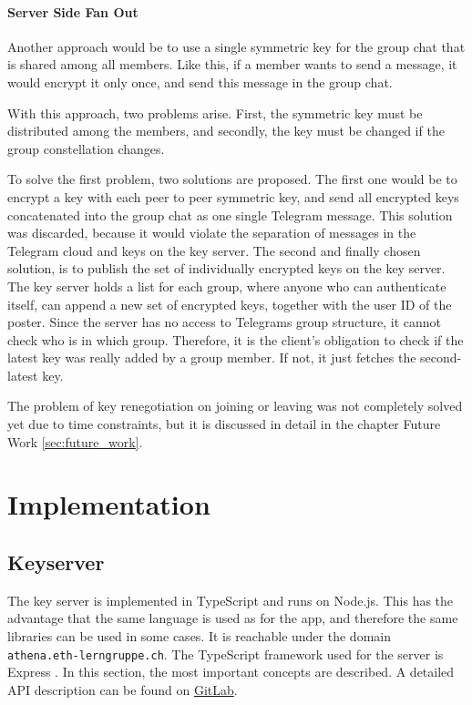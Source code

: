 \documentclass[a4paper, oneside]{discothesis}
\begin{document}
\subsubsection{Server Side Fan Out}

Another approach would be to use a single symmetric key for the group chat that is shared among all members. Like this, if a member wants to send a message, it would encrypt it only once, and send this message in the group chat.

With this approach, two problems arise. First, the symmetric key must be distributed among the members, and secondly, the key must be changed if the group constellation changes.

To solve the first problem, two solutions are proposed. The first one would be to encrypt a key with each peer to peer symmetric key, and send all encrypted keys concatenated into the group chat as one single Telegram message. This solution was discarded, because it would violate the separation of messages in the Telegram cloud and keys on the key server. The second and finally chosen solution, is to publish the set of individually encrypted keys on the key server. The key server holds a list for each group, where anyone who can authenticate itself, can append a new set of encrypted keys, together with the user ID of the poster. Since the server has no access to Telegrams group structure, it cannot check who is in which group. Therefore, it is the client's obligation to check if the latest key was really added by a group member. If not, it just fetches the second-latest key.

The problem of key renegotiation on joining or leaving was not completely solved yet due to time constraints, but it is discussed in detail in the chapter Future Work \ref{sec:future_work}.


\chapter{Implementation}




\section{Keyserver}

The key server is implemented in TypeScript and runs on Node.js. This has the advantage that the same language is used as for the app, and therefore the same libraries can be used in some cases. It is reachable under the domain \texttt{athena.eth-lerngruppe.ch}. The TypeScript framework used for the server is Express \cite{Express}. In this section, the most important concepts are described. A detailed API description can be found on  \href{https://gitlab.ethz.ch/disco-students/fs21/zarron_encrypted_chat/-/blob/1.0/Keyserver/API.md}{GitLab}.
\end{document}
